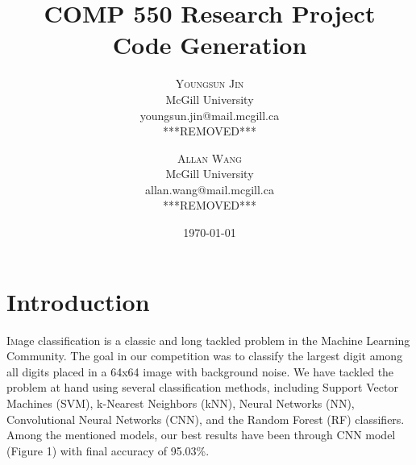 \documentclass[twoside,twocolumn]{article}
\title{%
	\huge COMP 550 Research Project \\
	\large Code Generation}
\author{%
\textsc{Youngsun Jin} \\
\normalsize McGill University \\ 
\normalsize youngsun.jin@mail.mcgill.ca \\
\normalsize {***REMOVED***} 
\and 
\textsc{Allan Wang} \\
\normalsize McGill University \\ 
\normalsize allan.wang@mail.mcgill.ca \\
\normalsize {***REMOVED***} 
}
\date{\today} %
\begin{document}
\maketitle


\section{Introduction}

\lettrine[nindent=0em,lines=2]{I} mage classification is a classic and long tackled problem in the Machine Learning Community. The goal in our competition was to classify the largest digit among all digits placed in a 64x64 image with background noise. We have tackled the problem at hand using several classification methods, including Support Vector Machines (SVM), k-Nearest Neighbors (kNN), Neural Networks (NN), Convolutional Neural Networks (CNN), and the Random Forest (RF) classifiers. Among the mentioned models, our best results have been through CNN model (Figure 1) with final accuracy of 95.03\%.


\end{document}
